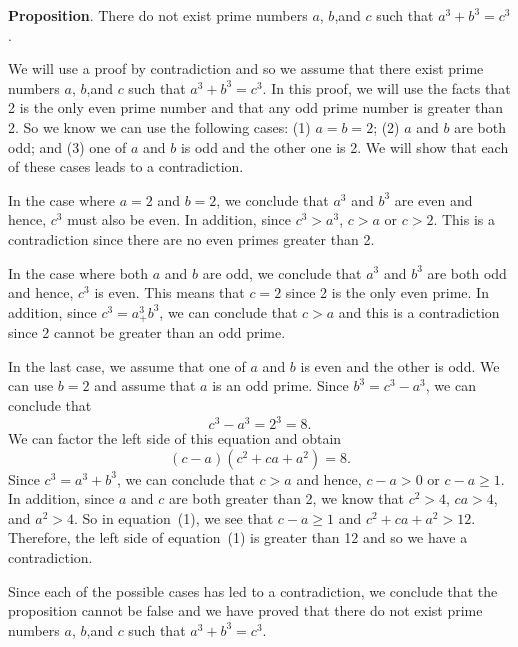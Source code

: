 \documentclass[11pt]{article}
\begin{document}
\noindent
\textbf{Proposition}.  There do not exist prime numbers $a$, $b$,and $c$ such that $a^3 + b^3 = c^3$.

\begin{myproof}
We will use a proof by contradiction and so we assume that there exist prime numbers $a$, $b$,and $c$ such that $a^3 + b^3 = c^3$.  In this proof, we will use the facts that 2 is the only even prime number and that any odd prime number is greater than 2.  So we know we can use the following cases:  (1) $a = b = 2$; (2) $a$ and $b$ are both odd; and (3) one of $a$ and $b$ is odd and the other one is 2.  We will show that each of these cases leads to a contradiction.

\newpar
In the case where $a = 2$ and $b = 2$, we conclude that $a^3$ and $b^3$ are even and hence, 
$c^3$ must also be even.  In addition, since $c^3 > a^3$, $c > a$ or $c > 2$.  This is a contradiction since there are no even primes greater than 2.

\newpar
In the case where both $a$ and $b$ are odd, we conclude that $a^3$ and $b^3$ are both odd and hence, 
$c^3$ is even.  This means that $c = 2$ since 2 is the only even prime.  In addition, since $c^3 = a^3 _+ b^3$, we can conclude that $c > a$ and this is a contradiction since 2 cannot be greater than an odd prime.

\newpar
In the last case, we assume that one of $a$ and $b$ is even and the other is odd.  We can use $b = 2$ and assume that $a$ is an odd prime.  Since $b^3 = c^3 - a^3$, we can conclude that
\[
c^3 - a^3 = 2^3 = 8.
\]
We can factor the left side of this equation and obtain
\begin{equation}
(c - a) \left( c^2 + c a + a^2 \right) = 8.
\end{equation}
Since $c^3 = a^3 + b^3$, we can conclude that $c > a$ and hence, $c - a > 0$ or $c - a \geq 1$.  In addition, since $a$ and $c$ are both greater than 2, we know that $c^2 > 4$, $c a > 4$, and $a^2 > 4$.  So in equation~(1), we see that $c - a \geq 1$ and $c^2 + c a + a^2 > 12$.  Therefore, the left side of equation~(1) is greater than 12 and so we have a contradiction.

\newpar
Since each of the possible cases has led to a contradiction, we conclude that the proposition cannot be false and we have proved that there do not exist prime numbers $a$, $b$,and $c$ such that $a^3 + b^3 = c^3$.
\end{myproof}
\end{document}
